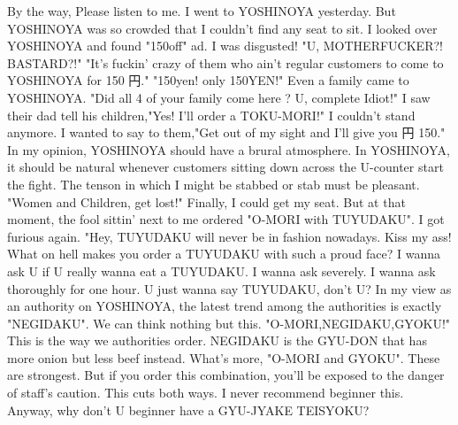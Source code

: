 \documentclass[14pt,a4paper]{ltjsarticle}
\begin{document}
By the way, Please listen to me. 
I went to YOSHINOYA yesterday. 
But YOSHINOYA was so crowded that I couldn't find any seat to sit. 
I looked over YOSHINOYA and found "150off" ad. 
I was disgusted! "U, MOTHERFUCKER?! BASTARD?!" 
"It's fuckin' crazy of them who ain't regular customers 
to come to YOSHINOYA for 150 円." 
"150yen! only 150YEN!" 
Even a family came to YOSHINOYA. "Did all 4 of your family come here ? 
U, complete Idiot!" 
I saw their dad tell his children,"Yes! I'll order a TOKU-MORI!" 
I couldn't stand anymore. 
I wanted to say to them,"Get out of my sight and I'll give you 円 150." 
In my opinion, YOSHINOYA should have a brural atmosphere. 
In YOSHINOYA, it should be natural whenever customers 
sitting down across the U-counter start the fight. 
The tenson in which I might be stabbed or stab must be pleasant. 
"Women and Children, get lost!" 
Finally, I could get my seat. But at that moment, 
the fool sittin' next to me ordered "O-MORI with TUYUDAKU". 
I got furious again. 
"Hey, TUYUDAKU will never be in fashion nowadays. 
Kiss my ass! 
What on hell makes you order a TUYUDAKU with such a proud face? 
I wanna ask U if U really wanna eat a TUYUDAKU. 
I wanna ask severely. 
I wanna ask thoroughly for one hour. 
U just wanna say TUYUDAKU, don't U? 
In my view as an authority on YOSHINOYA, 
the latest trend among the authorities is exactly "NEGIDAKU". 
We can think nothing but this. 
"O-MORI,NEGIDAKU,GYOKU!" This is the way we authorities order. 
NEGIDAKU is the GYU-DON that has more onion but less beef instead. 
What's more, "O-MORI and GYOKU". These are strongest. 
But if you order this combination, you'll be exposed to the danger of 
staff's caution. This cuts both ways. 
I never recommend beginner this. 
Anyway, why don't U beginner have a GYU-JYAKE TEISYOKU? 
\end{document}
